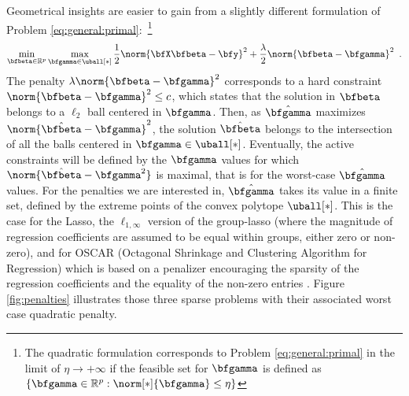 Geometrical insights are easier to gain from a slightly different formulation of
Problem \eqref{eq:general:primal}:~\footnote{%
The quadratic formulation corresponds to Problem \eqref{eq:general:primal} in 
the limit of $\eta\rightarrow+\infty$ if the feasible set for $\bfgamma$ is
defined as $\left\{\bfgamma\in\mathbb{R}^p:\norm[*]{\bfgamma}\leq
\eta\right\}$
}
%
\begin{equation}\label{eq:general:dual}
  \min_{\bfbeta\in\mathbb{R}^p} \max_{\bfgamma\in\uball[*]}
    \frac{1}{2} \norm{\bfX \bfbeta - \bfy}^2 + \frac{\lambda}{2} \norm{\bfbeta - \bfgamma}^2
  \enspace.
\end{equation}
The penalty $\lambda\norm{\bfbeta - \bfgamma}^2$ corresponds to a hard
constraint $\norm{\bfbeta - \bfgamma}^2\leq c$, which states that the 
solution in $\bfbeta$ belongs to a $\ell_{2}$ ball centered in $\bfgamma$.
Then, as $\hat{\bfgamma}$ maximizes $\norm{\hat{\bfbeta} - \bfgamma}^2$, the
solution $\hat{\bfbeta}$ belongs to the intersection of all the balls
centered in $\bfgamma\in\uball[*]$.
Eventually, the active constraints will be defined by the $\bfgamma$ values for
which $\norm{\hat{\bfbeta} - {\bfgamma}^2}$ is maximal, that is for the
worst-case $\hat{\bfgamma}$ values. 
For the penalties we are interested in, $\hat{\bfgamma}$ takes its value in a
finite set, defined by the extreme points of the convex polytope $\uball[*]$.
% 
% 
This is the case for the Lasso,
the $\ell_{1,\infty}$ version of the group-lasso 
(where the magnitude of regression coefficients are assumed to be equal within
groups, either zero or non-zero), 
and for OSCAR (Octagonal Shrinkage and Clustering Algorithm for Regression)
which is based on a penalizer encouraging the sparsity of the regression
coefficients and the equality of the non-zero entries \citep{Bondell08}.
%
Figure \ref{fig:penalties} illustrates  those three  sparse problems
with their  associated worst case quadratic penalty.


